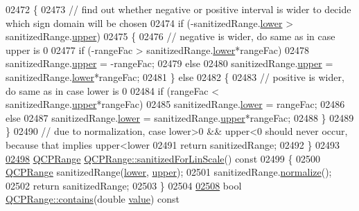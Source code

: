 \begin{DoxyCode}
02472   \{
02473     \textcolor{comment}{// find out whether negative or positive interval is wider to decide which sign domain will be chosen}
02474     \textcolor{keywordflow}{if} (-sanitizedRange.\hyperlink{a00049_aa3aca3edb14f7ca0c85d912647b91745}{lower} > sanitizedRange.\hyperlink{a00049_ae44eb3aafe1d0e2ed34b499b6d2e074f}{upper})
02475     \{
02476       \textcolor{comment}{// negative is wider, do same as in case upper is 0}
02477       \textcolor{keywordflow}{if} (-rangeFac > sanitizedRange.\hyperlink{a00049_aa3aca3edb14f7ca0c85d912647b91745}{lower}*rangeFac)
02478         sanitizedRange.\hyperlink{a00049_ae44eb3aafe1d0e2ed34b499b6d2e074f}{upper} = -rangeFac;
02479       \textcolor{keywordflow}{else}
02480         sanitizedRange.\hyperlink{a00049_ae44eb3aafe1d0e2ed34b499b6d2e074f}{upper} = sanitizedRange.\hyperlink{a00049_aa3aca3edb14f7ca0c85d912647b91745}{lower}*rangeFac;
02481     \} \textcolor{keywordflow}{else}
02482     \{
02483       \textcolor{comment}{// positive is wider, do same as in case lower is 0}
02484       \textcolor{keywordflow}{if} (rangeFac < sanitizedRange.\hyperlink{a00049_ae44eb3aafe1d0e2ed34b499b6d2e074f}{upper}*rangeFac)
02485         sanitizedRange.\hyperlink{a00049_aa3aca3edb14f7ca0c85d912647b91745}{lower} = rangeFac;
02486       \textcolor{keywordflow}{else}
02487         sanitizedRange.\hyperlink{a00049_aa3aca3edb14f7ca0c85d912647b91745}{lower} = sanitizedRange.\hyperlink{a00049_ae44eb3aafe1d0e2ed34b499b6d2e074f}{upper}*rangeFac;
02488     \}
02489   \}
02490   \textcolor{comment}{// due to normalization, case lower>0 && upper<0 should never occur, because that implies upper<lower}
02491   \textcolor{keywordflow}{return} sanitizedRange;
02492 \}
02493 
\hypertarget{a00115_source_l02498}{}\hyperlink{a00049_a1ff029704c29a75adbc1dc36cecaf44c}{02498} \hyperlink{a00049}{QCPRange} \hyperlink{a00049_a1ff029704c29a75adbc1dc36cecaf44c}{QCPRange::sanitizedForLinScale}()\textcolor{keyword}{ const}
02499 \textcolor{keyword}{}\{
02500   \hyperlink{a00049}{QCPRange} sanitizedRange(\hyperlink{a00049_aa3aca3edb14f7ca0c85d912647b91745}{lower}, \hyperlink{a00049_ae44eb3aafe1d0e2ed34b499b6d2e074f}{upper});
02501   sanitizedRange.\hyperlink{a00049_af914a7740269b0604d0827c634a878a9}{normalize}();
02502   \textcolor{keywordflow}{return} sanitizedRange;
02503 \}
02504 
\hypertarget{a00115_source_l02508}{}\hyperlink{a00049_a030ce95b527c32e01414d0351347b46d}{02508} \textcolor{keywordtype}{bool} \hyperlink{a00049_a030ce95b527c32e01414d0351347b46d}{QCPRange::contains}(\textcolor{keywordtype}{double} \hyperlink{a00116_aee90379adb0307effb138f4871edbc5c}{value})\textcolor{keyword}{ const}

\end{DoxyCode}
